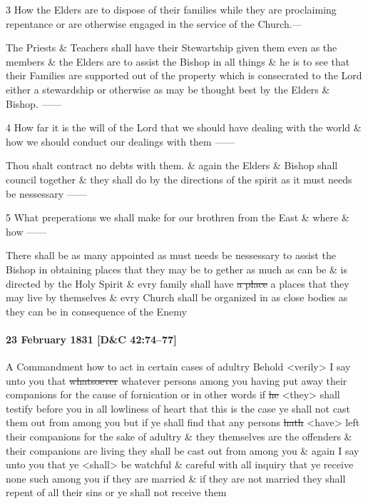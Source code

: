 				3 How the Elders are to dispose of their families while they are proclaiming repentance or are otherwise engaged in the service of the Church.---

				The Priests \& Teachers shall have their Stewartship given them even as the members \& the Elders are to assist the Bishop in all things \& he is to see that their Families are supported out of the property which is consecrated to the Lord either a stewardship or otherwise as may be thought best by the Elders \& Bishop. ------

				4 How far it is the will of the Lord that we should have dealing with the world \& how we should conduct our dealings with them ------

				Thou shalt contract no debts with them. \& again the Elders \& Bishop shall council together \& they shall do by the directions of the spirit as it must needs be nessessary ------

				5 What preperations we shall make for our brothren from the East \& where \& how ------

				There shall be as many appointed as must needs be nessessary to assist the Bishop in obtaining places that they may be to gether as much as can be \& is directed by the Holy Spirit \& evry family shall have \sout{a place} a places that they may live by themselves \& evry Church shall be organized in as close bodies as they can be in consequence of the Enemy
			
			\paragraph{23 February 1831 [D\&C 42:74--77]}
			
				A Commandment how to act in certain cases of adultry Behold <verily> I say unto you that \sout{whatsoever} whatever persons among you having put away their companions for the cause of fornication or in other words if \sout{he} <they> shall testify before you in all lowliness of heart that this is the case ye shall not cast them out from among you but if ye shall find that any persons \sout{hath} <have> left their companions for the sake of adultry \& they themselves are the offenders \& their companions are living they shall be cast out from among you \& again I say unto you that ye <shall> be watchful \& careful with all inquiry that ye receive none such among you if they are married \& if they are not married they shall repent of all their sins or ye shall not receive them
				
